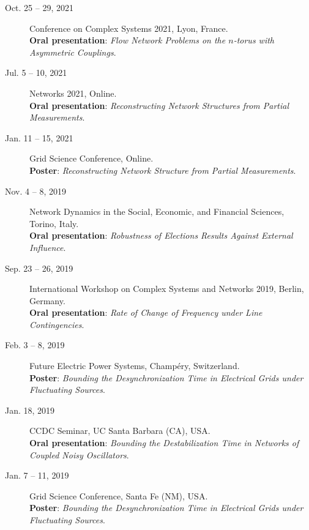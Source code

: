 \documentclass[10pt]{article}
\begin{document}
\begin{description}
 \item [Oct. 25 -- 29, 2021] Conference on Complex Systems 2021, Lyon, France. \\
 \textcolor{hei}{\bf Oral presentation}: \textit{Flow Network Problems on the $n$-torus with Asymmetric Couplings}.
 
 \item [Jul. 5 -- 10, 2021] Networks 2021, Online. \\
 \textcolor{hei}{\bf Oral presentation}: \textit{Reconstructing Network Structures from Partial Measurements}.
 
 \item [Jan. 11 -- 15, 2021] Grid Science Conference, Online. \\
 \textcolor{hei}{\bf Poster}: \textit{Reconstructing Network Structure from Partial Measurements}.
 
 \item [Nov. 4 -- 8, 2019] Network Dynamics in the Social, Economic, and Financial Sciences, Torino, Italy. \\
 \textcolor{hei}{\bf Oral presentation}: \textit{Robustness of Elections Results Against External Influence}. 
 
 \item [Sep. 23 -- 26, 2019] International Workshop on Complex Systems and Networks 2019, Berlin, Germany. \\
 \textcolor{hei}{\bf Oral presentation}: \textit{Rate of Change of Frequency under Line Contingencies}. 

 \item [Feb. 3 -- 8, 2019] Future Electric Power Systems, Champ\'ery, Switzerland. \\
 \textcolor{hei}{\bf Poster}: \textit{Bounding the Desynchronization Time in Electrical Grids under Fluctuating Sources}.
 
 \item [Jan. 18, 2019] CCDC Seminar, UC Santa Barbara (CA), USA. \\
 \textcolor{hei}{\bf Oral presentation}: \textit{Bounding the Destabilization Time in Networks of Coupled Noisy Oscillators}.
 
 \item [Jan. 7 -- 11, 2019] Grid Science Conference, Santa Fe (NM), USA. \\
 \textcolor{hei}{\bf Poster}: \textit{Bounding the Desynchronization Time in Electrical Grids under Fluctuating Sources}. 
 

\end{description}
\end{document}
